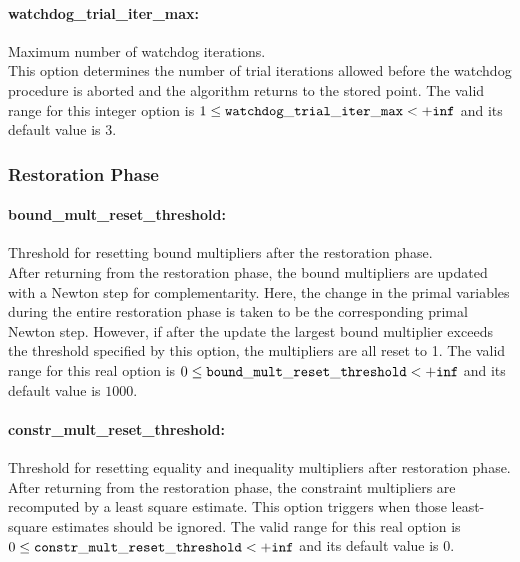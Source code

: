\paragraph{watchdog\_trial\_iter\_max:}\label{sec:watchdog_trial_iter_max} Maximum number of watchdog iterations. $\;$ \\
 This option determines the number of trial
iterations allowed before the watchdog procedure
is aborted and the algorithm returns to the
stored point. The valid range for this integer option is
$1 \le {\tt watchdog\_trial\_iter\_max } <  {\tt +inf}$
and its default value is $3$.


\subsubsection{Restoration Phase}
\label{sec:Restoration_Phase}

\paragraph{bound\_mult\_reset\_threshold:}\label{sec:bound_mult_reset_threshold} Threshold for resetting bound multipliers after the restoration phase. $\;$ \\
 After returning from the restoration phase, the
bound multipliers are updated with a Newton step
for complementarity.  Here, the change in the
primal variables during the entire restoration
phase is taken to be the corresponding primal
Newton step. However, if after the update the
largest bound multiplier exceeds the threshold
specified by this option, the multipliers are all
reset to 1. The valid range for this real option is 
$0 \le {\tt bound\_mult\_reset\_threshold } <  {\tt +inf}$
and its default value is $1000$.


\paragraph{constr\_mult\_reset\_threshold:}\label{sec:constr_mult_reset_threshold} Threshold for resetting equality and inequality multipliers after restoration phase. $\;$ \\
 After returning from the restoration phase, the
constraint multipliers are recomputed by a least
square estimate.  This option triggers when those
least-square estimates should be ignored. The valid range for this real option is 
$0 \le {\tt constr\_mult\_reset\_threshold } <  {\tt +inf}$
and its default value is $0$.


